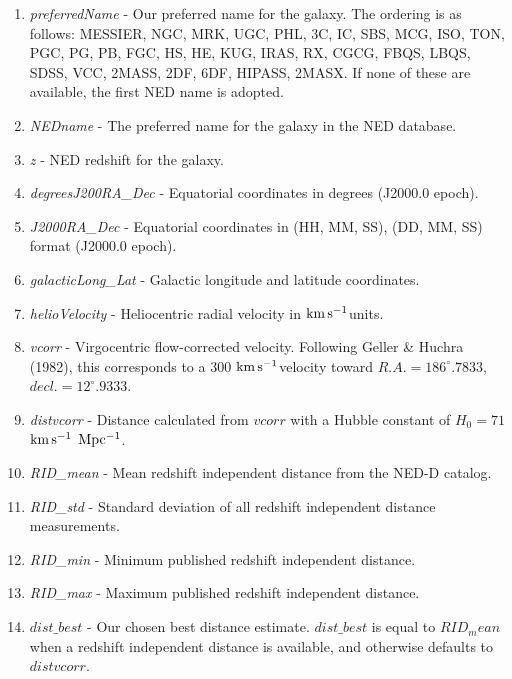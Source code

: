 \documentclass[iop]{emulateapj-rtx4}
\newcommand{\kms}{$\rm km\, s^{-1}$}
\begin{document}
\begin{enumerate}

\item \textit{preferredName} - Our preferred name for the galaxy. The ordering is as follows: MESSIER, NGC, MRK, UGC, PHL, 3C, IC, SBS, MCG, ISO, TON, PGC, PG, PB, FGC, HS, HE, KUG, IRAS, RX, CGCG, FBQS, LBQS, SDSS, VCC, 2MASS, 2DF, 6DF, HIPASS, 2MASX. If none of these are available, the first NED name is adopted.

\item \textit{NEDname} - The preferred name for the galaxy in the NED database.

\item \textit{z} - NED redshift for the galaxy. 

\item \textit{degreesJ200RA\_Dec} - Equatorial coordinates in degrees (J2000.0 epoch).

\item \textit{J2000RA\_Dec} - Equatorial coordinates in (HH, MM, SS), (DD, MM, SS) format (J2000.0 epoch).

\item \textit{galacticLong\_Lat} - Galactic longitude and latitude coordinates.

\item \textit{helioVelocity} - Heliocentric radial velocity in \kms units.

\item \textit{vcorr} - Virgocentric flow-corrected velocity. Following Geller \& Huchra (1982), this corresponds to a 300 \kms velocity toward $R.A. = 186^{\circ}.7833$, $decl. = 12^{\circ}.9333$.

\item \textit{distvcorr} - Distance calculated from $vcorr$ with a Hubble constant of $H_0 = 71$ \kms $~\rm Mpc^{-1}$.

\item \textit{RID\_mean} - Mean redshift independent distance from the NED-D catalog.

\item \textit{RID\_std} - Standard deviation of all redshift independent distance measurements.

\item \textit{RID\_min} - Minimum published redshift independent distance.

\item \textit{RID\_max} - Maximum published redshift independent distance.

\item \textit{$dist\_best$} - Our chosen best distance estimate. $dist\_best$ is equal to $RID_mean$ when a redshift independent distance is available, and otherwise defaults to $distvcorr$.


\end{enumerate}
\end{document}
